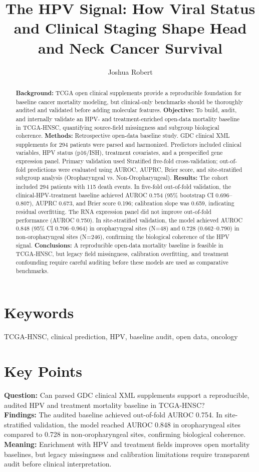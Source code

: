 \documentclass[11pt]{article}
\title{\textbf{The HPV Signal: How Viral Status and Clinical Staging Shape Head and Neck Cancer Survival}}
\author[1,2]{Joshua Robert}
\affil[1]{TAMU School of Engineering Medicine}
\affil[2]{Houston Methodist Hospital}
\date{}
\begin{document}
\maketitle

\begin{abstract}
\textbf{Background:} TCGA open clinical supplements provide a reproducible foundation for baseline cancer mortality modeling, but clinical-only benchmarks should be thoroughly audited and validated before adding molecular features.
\textbf{Objective:} To build, audit, and internally validate an HPV- and treatment-enriched open-data mortality baseline in TCGA-HNSC, quantifying source-field missingness and subgroup biological coherence.
\textbf{Methods:} Retrospective open-data baseline study. GDC clinical XML supplements for 294 patients were parsed and harmonized. Predictors included clinical variables, HPV status (p16/ISH), treatment covariates, and a prespecified gene expression panel. Primary validation used Stratified five-fold cross-validation; out-of-fold predictions were evaluated using AUROC, AUPRC, Brier score, and site-stratified subgroup analysis (Oropharyngeal vs. Non-Oropharyngeal).
\textbf{Results:} The cohort included 294 patients with 115 death events. In five-fold out-of-fold validation, the clinical-HPV-treatment baseline achieved AUROC 0.754 (95\% bootstrap CI 0.696--0.807), AUPRC 0.673, and Brier score 0.196; calibration slope was 0.659, indicating residual overfitting. The RNA expression panel did not improve out-of-fold performance (AUROC 0.750). In site-stratified validation, the model achieved AUROC 0.848 (95\% CI 0.706--0.964) in oropharyngeal sites (N=48) and 0.728 (0.662--0.790) in non-oropharyngeal sites (N=246), confirming the biological coherence of the HPV signal.
\textbf{Conclusions:} A reproducible open-data mortality baseline is feasible in TCGA-HNSC, but legacy field missingness, calibration overfitting, and treatment confounding require careful auditing before these models are used as comparative benchmarks.
\end{abstract}

\section*{Keywords}
TCGA-HNSC, clinical prediction, HPV, baseline audit, open data, oncology

\section*{Key Points}
\textbf{Question:} Can parsed GDC clinical XML supplements support a reproducible, audited HPV and treatment mortality baseline in TCGA-HNSC?\\
\textbf{Findings:} The audited baseline achieved out-of-fold AUROC 0.754. In site-stratified validation, the model reached AUROC 0.848 in oropharyngeal sites compared to 0.728 in non-oropharyngeal sites, confirming biological coherence.\\
\textbf{Meaning:} Enrichment with HPV and treatment fields improves open mortality baselines, but legacy missingness and calibration limitations require transparent audit before clinical interpretation.
\end{document}

